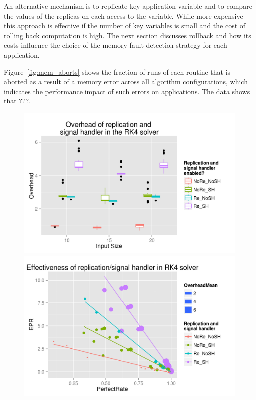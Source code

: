 \documentclass{sig-alternate}
\begin{document}
An alternative mechanism is to replicate key application variable and to compare the values of the replicas on each access to the variable.
While more expensive this approach is effective if the number of key variables is small and the cost of rolling back computation is high.
The next section discusses rollback and how its costs influence the choice of the memory fault detection strategy for each application.

Figure~\ref{fig:mem_aborts} shows the fraction of runs of each routine that is aborted as a result of a memory error across all algorithm configurations, which indicates the performance impact of such errors on applications.
The data shows that  ???.

\begin{figure}[ht!]
\centering
\includegraphics[width=1.00\columnwidth]{figs/4_1_2_Exp2_Overhead_Inputsize.png}
\includegraphics[width=1.00\columnwidth]{figs/4_1_2_Exp2_Effectiveness.png}

\end{figure}
\end{document}
